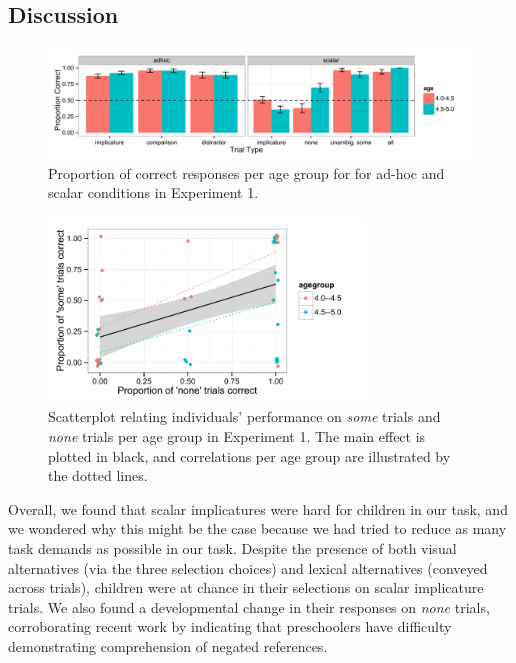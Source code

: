\documentclass[10pt,letterpaper]{article}
\begin{document}
\subsection{Discussion}

\begin{figure}[t] 
  \begin{center} 
    \includegraphics[width=7.5in]{figures/implicatures_adhocScalar_long.pdf} 
    \caption{\label{fig:expt1} Proportion of correct responses per age group for for ad-hoc and scalar conditions in Experiment 1.    }
    \end{center} 
\end{figure}

\begin{figure}[h] 
  \begin{center} 
    \includegraphics[width=3.3in]{figures/implicatures_adhocScalar_scatterplot.pdf} 
    \caption{\label{fig:expt1scatterplot} Scatterplot relating individuals' performance on \emph{some} trials and \emph{none} trials per age group in Experiment 1. The main effect is plotted in black, and correlations per age group are illustrated by the dotted lines.    }
    \end{center} 
\end{figure}





Overall, we found that scalar implicatures were hard for children in our task, and we wondered why this might be the case because we had tried to reduce as many task demands as possible in our task. Despite the presence of both visual alternatives (via the three selection choices) and lexical alternatives (conveyed across trials), children were at chance in their selections on scalar implicature trials. We also found a developmental change in their responses on \emph{none} trials, corroborating recent work by \cite{nordmeyer2014} indicating that preschoolers have difficulty demonstrating comprehension of negated references. 
\end{document}
